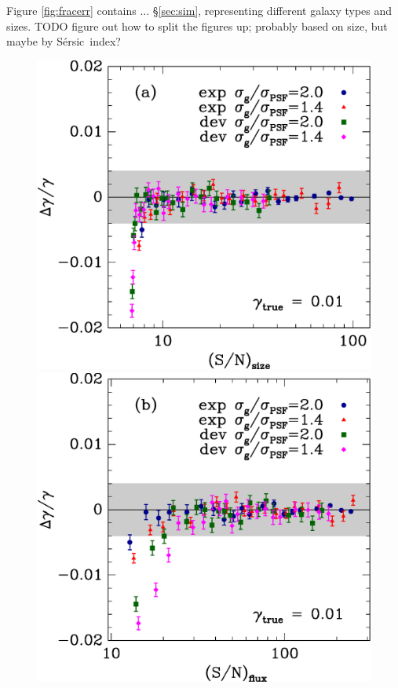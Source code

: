 \documentclass[12pt,preprint]{aastex}
\newcommand{\sersic}{S\'{e}rsic}
\begin{document}
Figure \ref{fig:fracerr} contains ...  \S \ref{sec:sim}, representing different
galaxy types and sizes.  TODO figure out how to split the figures up; probably
based on size, but maybe by \sersic\ index?

\begin{figure}[p] \centering
 \centering 
 \includegraphics[scale=0.45]{figures/cbafit-geg-T-s2n.eps}
 \includegraphics[scale=0.45]{figures/cbafit-geg-flux-s2n.eps}


\end{figure}
\end{document}
